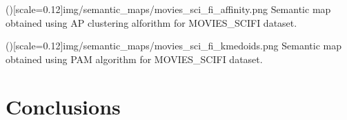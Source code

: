 \documentclass{ieeeaccess}
\newtheorem{Definition}{Definition}
\begin{document}
\Figure[h]()[scale=0.12]{img/semantic_maps/movies_sci_fi_affinity.png}
{Semantic map obtained using AP clustering alforithm for MOVIES\_SCIFI dataset.\label{fig:semantic_map_movies_affinity}}

\Figure[h]()[scale=0.12]{img/semantic_maps/movies_sci_fi_kmedoids.png}
{Semantic map obtained using PAM algorithm for MOVIES\_SCIFI dataset.\label{fig:semantic_map_movies_affinity}}

\section{Conclusions}
\label{sec:conclusions}


\begin{comment}



\section{Methodology}
\label{sec:Method}


\subsection{Preliminaries}

A \textbf{graph} $G$, also known as network, is an abstract data type consisting
of a finite set of vertices (nodes) $V$, a finite set of links (edges) $E$ (disjoint
from $V$), and an \textit{incidence function} $\psi_{G}$ that associates with each
edge of $G$, an unordered pair of vertices of $G$. If $e \in E$ and $u, v \in V$ such that 
$\psi_{G}(e) =  uv$, then $e$ is said to join $u$ and $v$; the vertices $u$ and $v$ are
called the \textit{ends} of $e$ \cite{bondy1976graph}.

When a graph has attributes associated to nodes or edges, it can be
considered a knowledge graph. A \textbf{knowledge graph}
$KG=(E,R,T)$ consists of a set of entities $E$, a set of relations 
$R$, and a set of triples $T \subseteq E \times R \times E^{1}$. A
triple connecting entities $e_{i},e_{j} \in E$ with relation $r_{k} 
\in R$ is denoted $x_{ijk} = (e_{i},r_{k},e_{j})$ \cite{Koutra2019}. 



The semantic problem consists of finding a SM(G), such that 



\begin{Definition}
\textbf{Functional summary of a Knowledge Graph} \\
Let $K_{i}$ be a set of functional clusters such that $C(u) \in K_{i}$ if and only if
$i \in C(i)$. For every $C(u) \in S_{\Delta}$, let $\Psi^{C(u)}$ be the structural knowledge
information value of $C(u)$. Given a knowledge graph $KG = (E,V,T)$ and input parameters
$b, d$, and $k$, the \textit{functional summarization problem adapted to KGs} generates a
\textit{k-cluster} FSKG $\Theta_{KG} = (S, F, P_{i}, \alpha)$ subject to $\vert S \vert = k$.


\end{comment}
\end{document}
